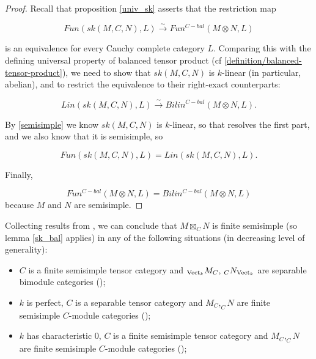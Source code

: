 \begin{proof}
  Recall that proposition \ref{univ_sk} asserts that the restriction map

  \[
   Fun(sk(M,C,N),L) \xrightarrow{\sim} Fun^{C-bal}(M \otimes N,L)
  \]

  is an equivalence for every Cauchy complete category $L$. Comparing this
  with the defining universal property of balanced tensor product
  (cf \ref{definition/balanced-tensor-product}), we need to show that
  $sk(M,C,N)$ is $k$-linear (in particular, abelian), and to restrict the
  equivalence to their right-exact counterparts:

  \[
    Lin(sk(M,C,N),L) \xrightarrow{\sim} Bilin^{C-bal}(M \otimes N, L).
  \]

  By \ref{semisimple} we know $sk(M,C,N)$ is $k$-linear, so that resolves the
  first part, and we also know that it is semisimple, so

  \[
    Fun(sk(M,C,N), L) = Lin(sk(M,C,N), L).
  \]

  Finally,

  \[
    Fun^{C-bal}(M \otimes N, L) = Bilin^{C-bal}(M \otimes N, L)
  \]
  because $M$ and $N$ are semisimple.
\end{proof}

\begin{remark}\label{semisimple_douglas/dualizable-tensor-categories}

  \noindent Collecting results
  from \cite{douglas/dualizable-tensor-categories}, we can conclude that
  $M\boxtimes_C N$ is finite semisimple (so lemma \ref{sk_bal} applies) in any
  of the following situations (in decreasing level of generality):

  \begin{itemize}

    \item $C$ is a finite semisimple tensor category and $_{\operatorname{Vect}_k}M_C$,
    $_{C}N_{\operatorname{Vect}_k}$ are separable bimodule categories (\cite[Proposition
    2.5.3, Theorem 2.5.5]{douglas/dualizable-tensor-categories});

    \item $k$ is perfect, $C$ is a separable tensor category and $M_C,_{C}N$ are
    finite semisimple $C$-module categories (\cite[Proposition
    2.5.10]{douglas/dualizable-tensor-categories});

    \item $k$ has characteristic $0$, $C$ is a finite semisimple tensor category 
    and $M_C,_{C}N$ are finite semisimple $C$-module categories
    (\cite[Corollary 2.6.9]{douglas/dualizable-tensor-categories});

  \end{itemize}
\end{remark}

